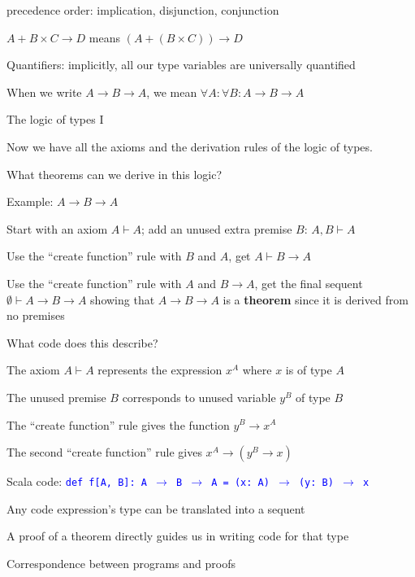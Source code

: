 precedence order: implication, disjunction, conjunction

$A+B\times C\rightarrow D$ means $\left(A+\left(B\times C\right)\right)\rightarrow D$

Quantifiers: implicitly, all our type variables are universally quantified

When we write $A\rightarrow B\rightarrow A$, we mean $\forall A:\forall B:A\rightarrow B\rightarrow A$

The logic of types I

Now we have all the axioms and the derivation rules of the logic of
types.

What theorems can we derive in this logic?

Example: $A\rightarrow B\rightarrow A$

Start with an axiom $A\vdash A$; add an unused extra premise $B$:
$A,B\vdash A$

Use the \textsf{``}create function\textsf{''} rule with $B$ and $A$, get $A\vdash B\rightarrow A$

Use the \textsf{``}create function\textsf{''} rule with $A$ and $B\rightarrow A$,
get the final sequent $\emptyset\vdash A\rightarrow B\rightarrow A$
showing that $A\rightarrow B\rightarrow A$ is a \textbf{theorem}
since it is derived from no premises

What code does this describe?

The axiom $A\vdash A$ represents the expression $x^{A}$ where $x$
is of type $A$

The unused premise $B$ corresponds to unused variable $y^{B}$ of
type $B$

The \textsf{``}create function\textsf{''} rule gives the function $y^{B}\rightarrow x^{A}$

The second \textsf{``}create function\textsf{''} rule gives $x^{A}\rightarrow\left(y^{B}\rightarrow x\right)$

Scala code: \texttt{\textcolor{blue}{\footnotesize{}def f{[}A, B{]}:\ A
$\rightarrow$ B $\rightarrow$ A = (x:\ A) $\rightarrow$ (y:\ B)
$\rightarrow$ x}}{\footnotesize\par}

Any code expression's type can be translated into a sequent

A proof of a theorem directly guides us in writing code for that type

Correspondence between programs and proofs

